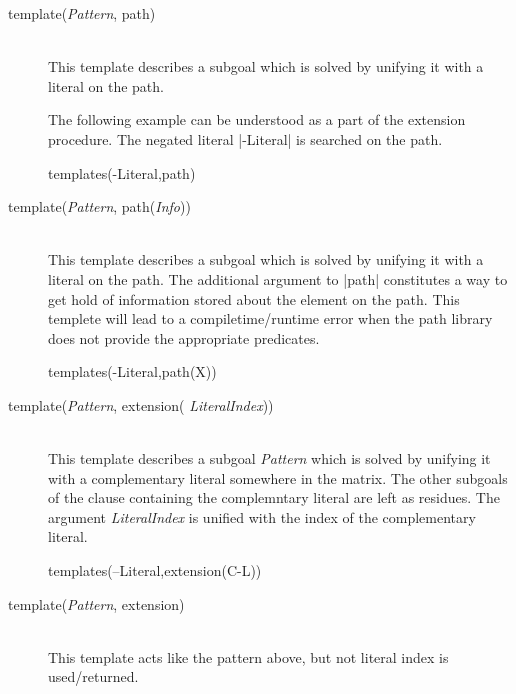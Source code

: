 \begin{description}

  \item [template({\em Pattern}, path)]\ 
    \\ 
    This template describes a subgoal which is solved by unifying it with a
    literal on the path.

    The following example can be understood as a part of the extension
    procedure. The negated literal |-Literal| is searched on the path.

    \begin{BoxedSample}
      templates(-Literal,path)%
    \end{BoxedSample}

  \item [template({\em Pattern}, path({\em Info}))]\index{Capri!path
      template}\ 
    \\
    This template describes a subgoal which is solved by unifying it with
    a literal on the path. The additional argument to |path| constitutes a
    way to get hold of information stored about the element on the path.
    This templete will lead to a compiletime/runtime error when the path
    library does not provide the appropriate predicates.

    \begin{BoxedSample}
      templates(-Literal,path(X))%
    \end{BoxedSample}

  \item [template({\em Pattern}, extension({\em
      LiteralIndex}))]\ 
    \\
    This template describes a subgoal {\em Pattern}\/ which is solved by
    unifying it with a complementary literal somewhere in the matrix. The
    other subgoals of the clause containing the complemntary literal are left
    as residues. The argument {\em LiteralIndex}\/ is unified with the index
    of the complementary literal.

    \begin{BoxedSample}
      templates(--Literal,extension(C-L))%
    \end{BoxedSample}

  \item [template({\em Pattern}, extension)]\ 
    \\
    This template acts like the pattern above, but not literal index is
    used/returned.


\end{description}
